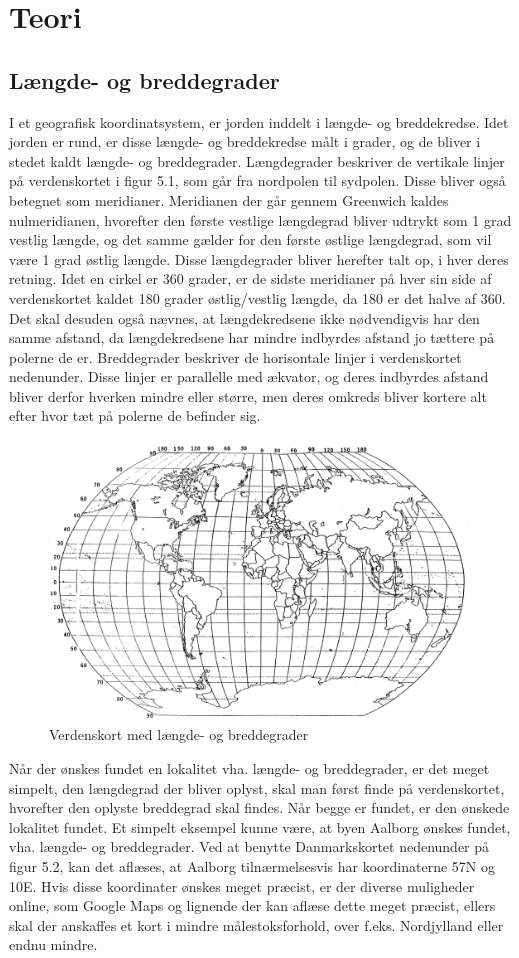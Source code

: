 \chapter{Teori} %
\section{Længde- og breddegrader}
I et geografisk koordinatsystem, er jorden inddelt i længde- og breddekredse. Idet jorden er rund, er disse længde- og breddekredse målt i grader, og de bliver i stedet kaldt længde- og breddegrader. \newline
Længdegrader beskriver de vertikale linjer på verdenskortet i figur 5.1, som går fra nordpolen til sydpolen. Disse bliver også betegnet som meridianer. Meridianen der går gennem Greenwich kaldes nulmeridianen, hvorefter den første vestlige længdegrad bliver udtrykt som 1 grad vestlig længde, og det samme gælder for den første østlige længdegrad, som vil være 1 grad østlig længde. Disse længdegrader bliver herefter talt op, i hver deres retning. Idet en cirkel er 360 grader, er de sidste meridianer på hver sin side af verdenskortet kaldet 180 grader østlig/vestlig længde, da 180 er det halve af 360. Det skal desuden også nævnes, at længdekredsene ikke nødvendigvis har den samme afstand, da længdekredsene har mindre indbyrdes afstand jo tættere på polerne de er. \newline
Breddegrader beskriver de horisontale linjer i verdenskortet nedenunder. Disse linjer er parallelle med ækvator, og deres indbyrdes afstand bliver derfor hverken mindre eller større, men deres omkreds bliver kortere alt efter hvor tæt på polerne de befinder sig.
\begin{figure} [h]
	\centering
	\includegraphics[width=.5\textwidth]{billeder/longlatmap}
	\caption{Verdenskort med længde- og breddegrader}
\end{figure}
Når der ønskes fundet en lokalitet vha. længde- og breddegrader, er det meget simpelt, den længdegrad der bliver oplyst, skal man først finde på verdenskortet, hvorefter den oplyste breddegrad skal findes. Når begge er fundet, er den ønskede lokalitet fundet. Et simpelt eksempel kunne være, at byen Aalborg ønskes fundet, vha. længde- og breddegrader. Ved at benytte Danmarkskortet nedenunder på figur 5.2, kan det aflæses, at Aalborg tilnærmelsesvis har koordinaterne 57\textdegree N og 10\textdegree E. Hvis disse koordinater ønskes meget præcist, er der diverse muligheder online, som Google Maps og lignende der kan aflæse dette meget præcist, ellers skal der anskaffes et kort i mindre målestoksforhold, over f.eks. Nordjylland eller endnu mindre.  \citep{LongLat}
